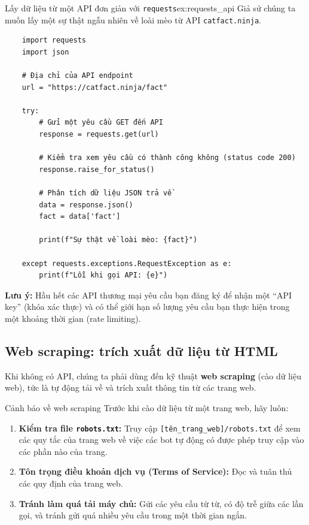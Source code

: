 \begin{example}{Lấy dữ liệu từ một API đơn giản với \texttt{requests}}{ex:requests_api}
    Giả sử chúng ta muốn lấy một sự thật ngẫu nhiên về loài mèo từ API \texttt{catfact.ninja}.

    \begin{verbatim}
    import requests
    import json

    # Địa chỉ của API endpoint
    url = "https://catfact.ninja/fact"

    try:
        # Gửi một yêu cầu GET đến API
        response = requests.get(url)
        
        # Kiểm tra xem yêu cầu có thành công không (status code 200)
        response.raise_for_status() 
        
        # Phân tích dữ liệu JSON trả về
        data = response.json()
        fact = data['fact']
        
        print(f"Sự thật về loài mèo: {fact}")
        
    except requests.exceptions.RequestException as e:
        print(f"Lỗi khi gọi API: {e}")

    \end{verbatim}
    \textbf{Lưu ý:} Hầu hết các API thương mại yêu cầu bạn đăng ký để nhận một “API key” (khóa xác thực) và có thể giới hạn số lượng yêu cầu bạn thực hiện trong một khoảng thời gian (rate limiting).
\end{example}

\subsection{Web scraping: trích xuất dữ liệu từ HTML}
\label{ssec:web_scraping}
Khi không có API, chúng ta phải dùng đến kỹ thuật \textbf{web scraping} (cào dữ liệu web), tức là tự động tải về và trích xuất thông tin từ các trang web.

\begin{pitfall}{Cảnh báo về web scraping}
Trước khi cào dữ liệu từ một trang web, hãy luôn:
\begin{enumerate}
    \item \textbf{Kiểm tra file \texttt{robots.txt}:} Truy cập \texttt{[tên\_\allowbreak trang\_\allowbreak web]/\allowbreak robots.\allowbreak txt} để xem các quy tắc của trang web về việc các bot tự động có được phép truy cập vào các phần nào của trang.
    \item \textbf{Tôn trọng điều khoản dịch vụ (Terms of Service):} Đọc và tuân thủ các quy định của trang web.
    \item \textbf{Tránh làm quá tải máy chủ:} Gửi các yêu cầu từ từ, có độ trễ giữa các lần gọi, và tránh gửi quá nhiều yêu cầu trong một thời gian ngắn.
\end{enumerate}
\end{pitfall}

